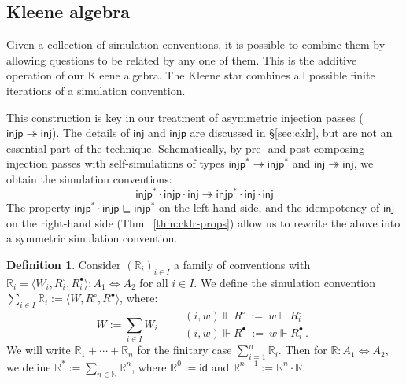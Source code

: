 \documentclass[draft,11pt]{report}
\theoremstyle{definition}
\newtheorem{definition}[theorem]{Definition}
\newcommand{\kw}[1]{\ensuremath{ \mathsf{#1} }}
\newcommand{\que}{\circ}         %
\newcommand{\ans}{\bullet}       %
\newcommand{\scref}{\sqsubseteq} %
\begin{document}
\subsection{Kleene algebra} %

Given a collection of simulation conventions,
it is possible to combine them
by allowing questions to be related by any one of them.
This is the additive operation of our Kleene algebra.
The Kleene star combines all possible finite iterations
of a simulation convention.

This construction is key in our treatment of
asymmetric injection passes
($\kw{injp} \twoheadrightarrow \kw{inj}$).
The details of $\kw{inj}$ and $\kw{injp}$
are discussed in \S\ref{sec:cklr},
but are not an essential part of the technique.
Schematically,
by pre- and post-composing injection passes
with self-simulations of types
$\kw{injp}^* \twoheadrightarrow \kw{injp}^*$ and
$\kw{inj} \twoheadrightarrow \kw{inj}$,
we obtain the simulation conventions:
\[
  \kw{injp}^* \cdot \kw{injp} \cdot \kw{inj}
  \twoheadrightarrow
  \kw{injp}^* \cdot \kw{inj} \cdot \kw{inj}
\]
The property $\kw{injp}^* \cdot \kw{injp} \scref \kw{injp}^*$
on the left-hand side,
and the idempotency of $\kw{inj}$
on the right-hand side (Thm.~\ref{thm:cklr-props})
allow us to rewrite the above into
a symmetric simulation convention.

\begin{definition} \label{def:joins} %
Consider $(\mathbb{R}_i)_{i \in I}$
a family of conventions
with
$\mathbb{R}_i = \langle W_i, R_i^\que, R_i^\ans \rangle
  : A_1 \Leftrightarrow A_2$
for all $i \in I$.
We define the simulation convention
$\sum_{i \in I} \mathbb{R}_i := \langle W, R^\que, R^\ans \rangle$,
where:
\[
  W := \sum_{i \in I} W_i  \qquad
  \begin{array}{l}
  (i, w) \Vdash R^\que \: := \: w \Vdash R_i^\que \\[1ex]
  (i, w) \Vdash R^\ans \: := \: w \Vdash R_i^\ans \,.
  \end{array}
\]
We will write $\mathbb{R}_1 + \cdots + \mathbb{R}_n$
for the finitary case $\sum_{i=1}^n \mathbb{R}_i$.
Then for $\mathbb{R} : A_1 \Leftrightarrow A_2$,
we define
$\mathbb{R}^* := \sum_{n \in \mathbb{N}} \mathbb{R}^n$,
where
$\mathbb{R}^0 := \kw{id}$ and
$\mathbb{R}^{n+1} := \mathbb{R}^n \cdot \mathbb{R}$.
\end{definition}
\end{document}
